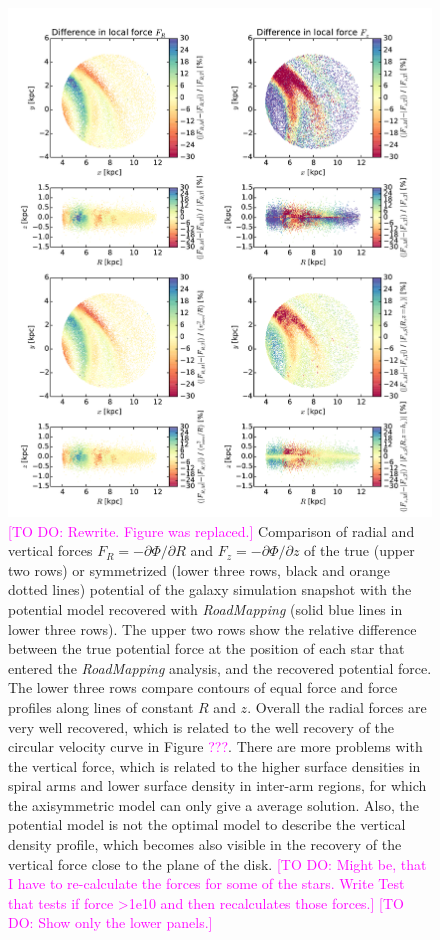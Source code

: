 \documentclass[iop,revtex4,numberedappendix,appendixfloats]{emulateapj}
\newcommand{\RM}{{\sl RoadMapping}}
\newcommand{\Wilma}[1]{\textcolor{Magenta}{#1}}
\begin{document}
\begin{figure}[!htbp]
\centering
\includegraphics[width=\columnwidth]{fig/MNdHHdiffSph2_4kpc8Spiral_a_test1_forces_overview_5.pdf}
\caption{\Wilma{[TO DO: Rewrite. Figure was replaced.]} Comparison of radial and vertical forces  $F_R=-\partial \Phi / \partial R$ and $F_z = -\partial \Phi / \partial z$ of the true (upper two rows) or symmetrized (lower three rows, black and orange dotted lines) potential of the galaxy simulation snapshot with the potential model recovered with \RM{} (solid blue lines in lower three rows). The upper two rows show the relative difference between the true potential force at the position of each star that entered the \RM{} analysis, and the recovered potential force. The lower three rows compare contours of equal force and force profiles along lines of constant $R$ and $z$. Overall the radial forces are very well recovered, which is related to the well recovery of the circular velocity curve in Figure \Wilma{???}. There are more problems with the vertical force, which is related to the higher surface densities in spiral arms and lower surface density in inter-arm regions, for which the axisymmetric model can only give a average solution. Also, the potential model is not the optimal model to describe the vertical density profile, which becomes also visible in the recovery of the vertical force close to the plane of the disk. \Wilma{[TO DO: Might be, that I have to re-calculate the forces for some of the stars. Write Test that tests if force >1e10 and then recalculates those forces.]} \Wilma{[TO DO: Show only the lower panels.]}}
\label{fig:???}
\end{figure}
\end{document}
